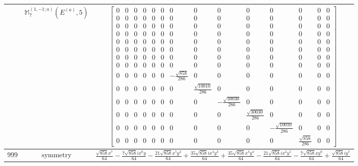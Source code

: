 \documentclass[fleqn,8pt,landscape]{jsarticle}
\begin{document}
\begin{longtable}{ccc}
$  $ & $ \mathbb{M}_{7}^{(1,-1;a)}(E^{(a)},5) $ & $ \begin{bmatrix} 0 & 0 & 0 & 0 & 0 & 0 & 0 & 0 & 0 & 0 & 0 & 0 & 0 & 0 \\ 0 & 0 & 0 & 0 & 0 & 0 & 0 & 0 & 0 & 0 & 0 & 0 & 0 & 0 \\ 0 & 0 & 0 & 0 & 0 & 0 & 0 & 0 & 0 & 0 & 0 & 0 & 0 & 0 \\ 0 & 0 & 0 & 0 & 0 & 0 & 0 & 0 & 0 & 0 & 0 & 0 & 0 & 0 \\ 0 & 0 & 0 & 0 & 0 & 0 & 0 & 0 & 0 & 0 & 0 & 0 & 0 & 0 \\ 0 & 0 & 0 & 0 & 0 & 0 & 0 & 0 & 0 & 0 & 0 & 0 & 0 & 0 \\ 0 & 0 & 0 & 0 & 0 & 0 & 0 & 0 & 0 & 0 & 0 & 0 & 0 & 0 \\ 0 & 0 & 0 & 0 & 0 & 0 & 0 & 0 & 0 & 0 & 0 & 0 & 0 & 0 \\ 0 & 0 & 0 & 0 & 0 & 0 & - \frac{\sqrt{858}}{286} & 0 & 0 & 0 & 0 & 0 & 0 & 0 \\ 0 & 0 & 0 & 0 & 0 & 0 & 0 & \frac{\sqrt{10010}}{286} & 0 & 0 & 0 & 0 & 0 & 0 \\ 0 & 0 & 0 & 0 & 0 & 0 & 0 & 0 & - \frac{\sqrt{30030}}{286} & 0 & 0 & 0 & 0 & 0 \\ 0 & 0 & 0 & 0 & 0 & 0 & 0 & 0 & 0 & \frac{\sqrt{30030}}{286} & 0 & 0 & 0 & 0 \\ 0 & 0 & 0 & 0 & 0 & 0 & 0 & 0 & 0 & 0 & - \frac{\sqrt{10010}}{286} & 0 & 0 & 0 \\ 0 & 0 & 0 & 0 & 0 & 0 & 0 & 0 & 0 & 0 & 0 & \frac{\sqrt{858}}{286} & 0 & 0 \end{bmatrix} $ \\ \hline
$ 999 $ & $ \text{symmetry} $ & $ \frac{\sqrt{858} x^{7}}{64} - \frac{7 \sqrt{858} i x^{6} y}{64} - \frac{21 \sqrt{858} x^{5} y^{2}}{64} + \frac{35 \sqrt{858} i x^{4} y^{3}}{64} + \frac{35 \sqrt{858} x^{3} y^{4}}{64} - \frac{21 \sqrt{858} i x^{2} y^{5}}{64} - \frac{7 \sqrt{858} x y^{6}}{64} + \frac{\sqrt{858} i y^{7}}{64} $ \\

\end{longtable}
\end{document}
